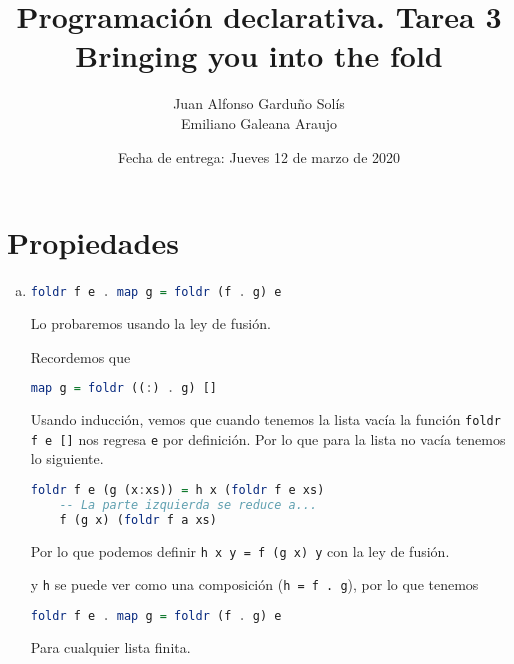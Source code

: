 \documentclass[spanish,12pt,letterpaper]{article}
\title{Programación declarativa. Tarea 3\\
  \Huge{Bringing you into the fold}}
\author{Juan Alfonso Garduño Solís\\
  Emiliano Galeana Araujo}
\affil{Facultad de ciencias, UNAM}
\date{Fecha de entrega: Jueves 12 de marzo de 2020}
\begin{document}
\maketitle

\section{Propiedades}
\begin{enumerate}[(a)]
\item
  \begin{lstlisting}[language=Haskell]
    foldr f e . map g = foldr (f . g) e
  \end{lstlisting}
  Lo probaremos usando la ley de fusión.
  
  Recordemos que
  \begin{lstlisting}[language=Haskell]
    map g = foldr ((:) . g) []
  \end{lstlisting}
  Usando inducción, vemos que cuando tenemos la lista vacía la función
  \texttt{foldr f e []} nos regresa \texttt{e} por definición. Por lo que para la
  lista no vacía tenemos lo siguiente.
  \begin{lstlisting}[language=Haskell]
    foldr f e (g (x:xs)) = h x (foldr f e xs)
    -- La parte izquierda se reduce a...
    f (g x) (foldr f a xs)
  \end{lstlisting}
  Por lo que podemos definir \texttt{h x y = f (g x) y} con la ley de fusión.

  y \texttt{h} se puede ver como una composición (\texttt{h = f . g}), por lo que
  tenemos
  \begin{lstlisting}[language=Haskell]
    foldr f e . map g = foldr (f . g) e
  \end{lstlisting}
  Para cualquier lista finita.
  

\end{enumerate}
\end{document}
